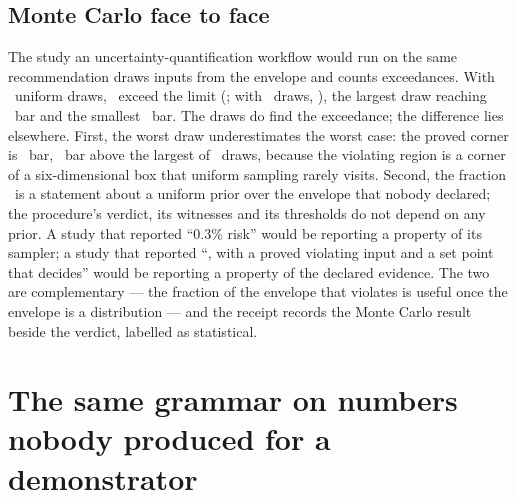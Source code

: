 \documentclass[preprint,11pt,authoryear]{elsarticle}
\begin{document}
\subsection{Monte Carlo face to face}\label{sec:mc}
The study an uncertainty-quantification workflow would run on the same recommendation draws inputs from the envelope and counts exceedances. With \MDraws\ uniform draws, \MOver\ exceed the limit (\MPOver; with \MDrawsK\ draws, \MPOverK), the largest draw reaching \MMax\ bar and the smallest \MMin\ bar. The draws do find the exceedance; the difference lies elsewhere. First, the worst draw underestimates the worst case: the proved corner is \GCornerAbove\ bar, \MGapCorner\ bar above the largest of \MDraws\ draws, because the violating region is a corner of a six-dimensional box that uniform sampling rarely visits. Second, the fraction \MPOver\ is a statement about a uniform prior over the envelope that nobody declared; the procedure's verdict, its witnesses and its thresholds do not depend on any prior. A study that reported ``0.3\% risk'' would be reporting a property of its sampler; a study that reported ``\vRefused, with a proved violating input and a set point that decides'' would be reporting a property of the declared evidence. The two are complementary --- the fraction of the envelope that violates is useful once the envelope is a distribution --- and the receipt records the Monte Carlo result beside the verdict, labelled as statistical.

\section{The same grammar on numbers nobody produced for a demonstrator}\label{sec:real}
\end{document}
